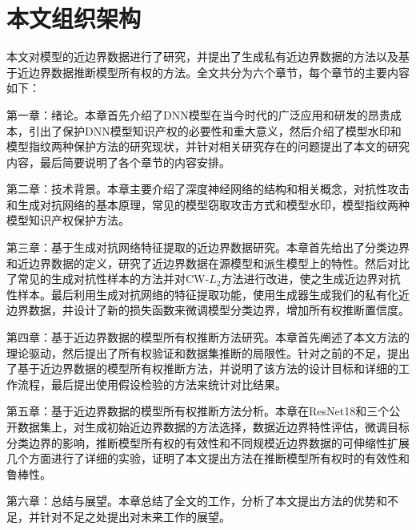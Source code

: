 \section{本文组织架构}

本文对模型的近边界数据进行了研究，并提出了生成私有近边界数据的方法以及基于近边界数据推断模型所有权的方法。全文共分为六个章节，每个章节的主要内容如下：

第一章：绪论。本章首先介绍了DNN模型在当今时代的广泛应用和研发的昂贵成本，引出了保护DNN模型知识产权的必要性和重大意义，然后介绍了模型水印和模型指纹两种保护方法的研究现状，并针对相关研究存在的问题提出了本文的研究内容，最后简要说明了各个章节的内容安排。

第二章：技术背景。本章主要介绍了深度神经网络的结构和相关概念，对抗性攻击和生成对抗网络的基本原理，常见的模型窃取攻击方式和模型水印，模型指纹两种模型知识产权保护方法。

第三章：基于生成对抗网络特征提取的近边界数据研究。本章首先给出了分类边界和近边界数据的定义，研究了近边界数据在源模型和派生模型上的特性。然后对比了常见的生成对抗性样本的方法并对CW-$L_2$方法进行改进，使之生成近边界对抗性样本。最后利用生成对抗网络的特征提取功能，使用生成器生成我们的私有化近边界数据，并设计了新的损失函数来微调模型分类边界，增加所有权推断置信度。

第四章：基于近边界数据的模型所有权推断方法研究。本章首先阐述了本文方法的理论驱动，然后提出了所有权验证和数据集推断的局限性。针对之前的不足，提出了基于近边界数据的模型所有权推断方法，并说明了该方法的设计目标和详细的工作流程，最后提出使用假设检验的方法来统计对比结果。

第五章：基于近边界数据的模型所有权推断方法分析。本章在ResNet18和三个公开数据集上，对生成初始近边界数据的方法选择，数据近边界特性评估，微调目标分类边界的影响，推断模型所有权的有效性和不同规模近边界数据的可伸缩性扩展几个方面进行了详细的实验，证明了本文提出方法在推断模型所有权时的有效性和鲁棒性。

第六章：总结与展望。本章总结了全文的工作，分析了本文提出方法的优势和不足，并针对不足之处提出对未来工作的展望。
